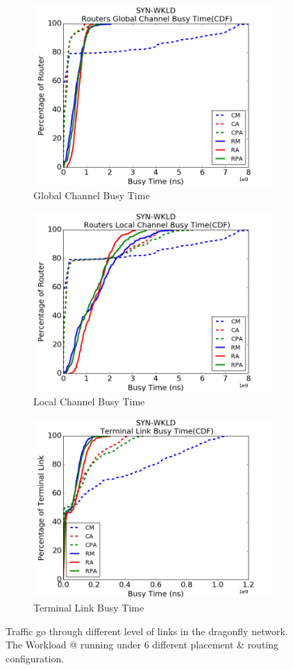 \documentclass[conference,compsoc]{IEEEtran}
\makeatletter
\newcommand{\Rmnum}[1]{\expandafter\@slowromancap\romannumeral #1@}
\makeatother
\begin{document}
\begin{figure}[t!]
    \centering   
    \begin{subfigure}[t]{0.32\textwidth}
        \centering
        \includegraphics[height=1.8 in]{syn-wkld/gc-btime}
        \caption{Global Channel Busy Time}
        \label{fig:synwkld-global-channel-stime}
    \end{subfigure}%
     \hspace{1em}%
    \begin{subfigure}[t]{0.32\textwidth}
        \centering
        \includegraphics[height=1.8 in]{syn-wkld/lc-btime}
        \caption{Local Channel Busy Time}
        \label{fig:synwkld-local-channel-stime}
    \end{subfigure}%
    \hspace{1em}%
    \begin{subfigure}[t]{0.32\textwidth}
        \centering
        \includegraphics[height=1.8 in]{syn-wkld/tl-btime}
        \caption{Terminal Link Busy Time}
        \label{fig:synwkld-terminal-link-stime}
    \end{subfigure}%
   \caption{Traffic go through different level of links in the dragonfly network. The Workload \Rmnum{2} running under 6 different placement \& routing configuration.}
   \label{fig:synwkld-network-stime}
\end{figure}
\end{document}
